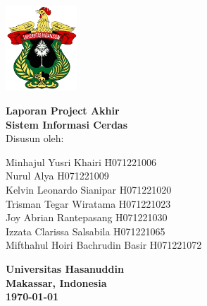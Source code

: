 \documentclass[a4paper,12pt]{report}
\begin{document}
\begin{titlepage}
    \centering
    \vspace*{1cm}
    
    \includegraphics[width=0.2\textwidth]{images/logo_unhas.png}\\ %
    \vspace{1cm}
    
    {\Large \textbf{Laporan Project Akhir}}\\
    \vspace{0.5cm}
    {\Large \textbf{Sistem Informasi Cerdas}}\\
    
    \vfill
    Disusun oleh:
    
    \begin{tabbing}
        Minhajul Yusri Khairi \hspace{3cm} \= H071221006 \\
        Nurul Alya \> H071221009 \\
        Kelvin Leonardo Sianipar \> H071221020 \\
        Trisman Tegar Wiratama \> H071221023 \\
        Joy Abrian Rantepasang \> H071221030 \\
        Izzata Clarissa Salsabila \> H071221065 \\
        Mifthahul Hoiri Bachrudin Basir \> H071221072 \\
    \end{tabbing}
    
    \vfill
    
    \textbf{Universitas Hasanuddin}\\
    \textbf{Makassar, Indonesia}\\
    \textbf{\today}
    
\end{titlepage}

\tableofcontents
\newpage







\end{document}
